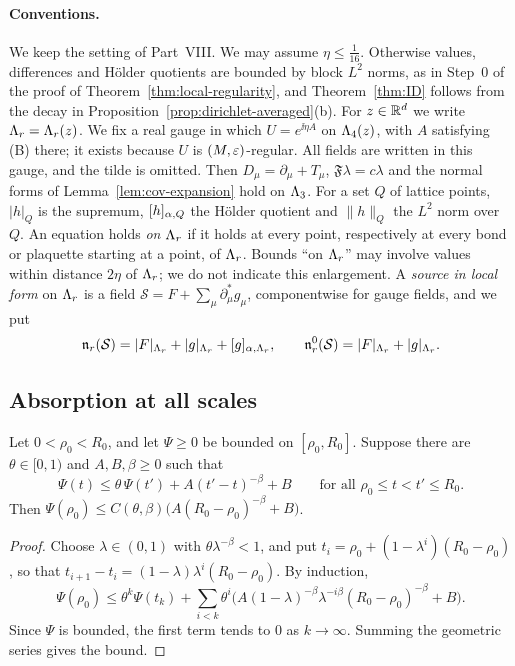 \paragraph{Conventions.} We keep the setting of Part~VIII. We may assume $\eta\le\frac1{16}$. Otherwise values, differences and H\"older quotients are bounded by block $L^2$ norms, as in Step~0 of the proof of Theorem~\ref{thm:local-regularity}, and Theorem~\ref{thm:ID} follows from the decay in Proposition~\ref{prop:dirichlet-averaged}(b). For $z\in\mathbb R^d$ we write $\Lambda_r=\Lambda_r(z)$. We fix a real gauge in which $U=e^{\ii\eta A}$ on $\Lambda_4(z)$, with $A$ satisfying (B) there; it exists because $U$ is $(M,\varepsilon)$-regular. All fields are written in this gauge, and the tilde is omitted. Then $D_\mu=\partial_\mu+T_\mu$, $\mathfrak F\lambda=c\lambda$ and the normal forms of Lemma~\ref{lem:cov-expansion} hold on $\Lambda_3$. For a set $Q$ of lattice points, $|h|_Q$ is the supremum, $[h]_{\alpha,Q}$ the H\"older quotient and $\|h\|_Q$ the $L^2$ norm over $Q$. An equation holds \emph{on $\Lambda_r$} if it holds at every point, respectively at every bond or plaquette starting at a point, of $\Lambda_r$. Bounds ``on $\Lambda_r$'' may involve values within distance $2\eta$ of $\Lambda_r$; we do not indicate this enlargement. A \emph{source in local form} on $\Lambda_r$ is a field $\mathcal S=F+\sum_\mu\partial^*_\mu g_\mu$, componentwise for gauge fields, and we put
\[
\mathfrak n_r(\mathcal S)=|F|_{\Lambda_r}+|g|_{\Lambda_r}+[g]_{\alpha,\Lambda_r},\qquad\mathfrak n^0_r(\mathcal S)=|F|_{\Lambda_r}+|g|_{\Lambda_r}.
\]

\subsection{Absorption at all scales}\label{ss:36.1}

\begin{lemma}\label{lem:iteration}
Let $0<\rho_0<R_0$, and let $\Psi\ge0$ be bounded on $[\rho_0,R_0]$. Suppose there are $\theta\in[0,1)$ and $A,B,\beta\ge0$ such that
\[
\Psi(t)\le\theta\,\Psi(t')+A(t'-t)^{-\beta}+B\qquad\text{for all }\rho_0\le t<t'\le R_0 .
\]
Then $\Psi(\rho_0)\le C(\theta,\beta)\big(A(R_0-\rho_0)^{-\beta}+B\big)$.
\end{lemma}

\begin{proof}
Choose $\lambda\in(0,1)$ with $\theta\lambda^{-\beta}<1$, and put $t_i=\rho_0+(1-\lambda^i)(R_0-\rho_0)$, so that $t_{i+1}-t_i=(1-\lambda)\lambda^i(R_0-\rho_0)$. By induction,
\[
\Psi(\rho_0)\le\theta^k\Psi(t_k)+\sum_{i<k}\theta^i\Big(A(1-\lambda)^{-\beta}\lambda^{-i\beta}(R_0-\rho_0)^{-\beta}+B\Big).
\]
Since $\Psi$ is bounded, the first term tends to $0$ as $k\to\infty$. Summing the geometric series gives the bound.
\end{proof}

